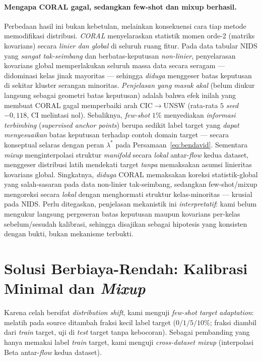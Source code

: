 \documentclass[11pt,a4paper]{article}
\begin{document}
\paragraph{Mengapa CORAL gagal, sedangkan few-shot dan mixup berhasil.} Perbedaan
hasil ini bukan kebetulan, melainkan konsekuensi cara tiap metode memodifikasi
distribusi. \emph{CORAL} menyelaraskan statistik momen orde-2 (matriks kovarians)
secara \emph{linier dan global} di seluruh ruang fitur. Pada data tabular NIDS yang
\emph{sangat tak-seimbang} dan berbatas-keputusan \emph{non-linier}, penyelarasan
kovarians global memperlakukan seluruh massa data secara seragam --- didominasi
kelas jinak mayoritas --- sehingga \emph{diduga} menggeser batas keputusan di
sekitar kluster serangan minoritas. \emph{Penjelasan yang masuk akal} (belum diukur
langsung sebagai geometri batas keputusan) adalah bahwa efek inilah yang membuat
CORAL gagal memperbaiki arah CIC$\rightarrow$UNSW (rata-rata $5$ \emph{seed}
$-0{,}118$, CI melintasi nol). Sebaliknya,
\emph{few-shot} $1\%$ menyediakan \emph{informasi terbimbing}
(\emph{supervised anchor points}) berupa sedikit label target yang \emph{dapat
menyesuaikan} batas keputusan terhadap contoh domain target --- secara konseptual
selaras dengan peran $\lambda^\ast$ pada Persamaan~\eqref{eq:bendavid}. Sementara
\emph{mixup} menginterpolasi struktur \emph{manifold} secara \emph{lokal}
antar-\emph{flow} kedua dataset, menggeser distribusi latih mendekati target
\emph{tanpa} memaksakan asumsi linieritas kovarians global. Singkatnya, \emph{diduga}
CORAL memaksakan koreksi statistik-global yang salah-sasaran pada data non-linier
tak-seimbang, sedangkan few-shot/mixup mengoreksi secara \emph{lokal} dengan
menghormati struktur kelas-minoritas --- krusial pada NIDS. Perlu ditegaskan,
penjelasan mekanistik ini \emph{interpretatif}: kami belum mengukur langsung
pergeseran batas keputusan maupun kovarians per-kelas sebelum/sesudah kalibrasi,
sehingga disajikan sebagai hipotesis yang konsisten dengan bukti, bukan mekanisme
terbukti.

\section{Solusi Berbiaya-Rendah: Kalibrasi Minimal dan \emph{Mixup}}
\label{sec:da}

Karena celah bersifat \emph{distribution shift}, kami menguji \emph{few-shot
target adaptation}: melatih pada source ditambah fraksi kecil label target
($0/1/5/10\%$; fraksi diambil dari \emph{train} target, uji di \emph{test}
target tanpa kebocoran). Sebagai pembanding yang hanya memakai label \emph{train}
target, kami menguji \emph{cross-dataset mixup} (interpolasi Beta antar-\emph{flow}
kedua dataset).
\end{document}
